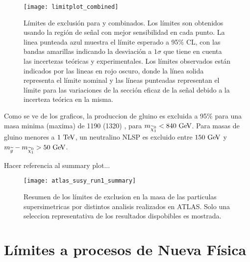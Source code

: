 \begin{figure}[!htbp]
  \centering

  \texttt{[image: limitplot\_combined]}

  \caption{Límites de exclusión para {\SRL} y {\SRH} combinados.
    Los límites son obtenidos usando la región de señal con mejor sensibilidad
    en cada punto.
    La linea punteada azul muestra el límite esperado a 95\% CL, con las bandas amarillas indicando la desviación a
    $1\sigma$ que tiene en cuenta las incertezas teóricas y experimentales. Los
    límites observados están indicados por las lineas en rojo oscuro, donde la línea
    solida representa el límite nominal y las líneas punteadas representan el límite
    para las variaciones de la sección eficaz de la señal debido a la incerteza
    teórica en la misma.}
   \label{fig:limit_combined}

\end{figure}


Como se ve de los graficos, la produccion de gluino es excluida a 95\% {\cl} para
una masa minima (maxima) de 1190 (1320) \gev, para $m_{\ninoone}<{840}\gev$.
Para masas de gluino menores a $1\tev$, un neutralino NLSP es excluido entre
$150\gev$ y $m_{\gluino}-m_{\ninoone}>50\gev$. 

Hacer referencia al summary plot...


\begin{figure}[!htbp]
  \centering

  \texttt{[image: atlas\_susy\_run1\_summary]}

  \caption{Resumen de los límites de exclusion en la masa de las particulas supersimetricas por distintos analisis realizados en ATLAS.
    Solo una seleccion representativa de los resultados dispobibles es mostrada\cite{susy_summary}.}
  \label{fig:susy_summary}

\end{figure}



\section{Límites a procesos de Nueva Física} \label{sec:model_independent}



